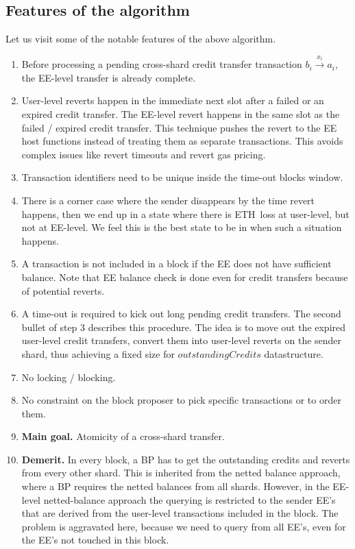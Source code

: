 \documentclass{article}
\newcommand{\eth}[0]{ETH~}
\begin{document}
\subsection{Features of the algorithm}
Let us visit some of the notable features of the above algorithm.
\begin{enumerate}
\item Before processing a pending cross-shard credit transfer transaction $b_i \stackrel{x_i}{\longrightarrow} a_i$, the EE-level transfer is already complete. 
\item User-level reverts happen in the immediate next slot after a failed or an expired credit transfer. The EE-level revert happens in the same slot as the failed / expired credit transfer. This technique pushes the revert to the EE host functions instead of treating them as separate transactions. This avoids complex issues like revert timeouts and revert gas pricing.
\item Transaction identifiers need to be unique inside the time-out blocks window.
\item There is a corner case where the sender disappears by the time revert happens, then we end up in a state where there is \eth loss at user-level, but not at EE-level. We feel this is the best state to be in when such a situation happens.
\item A transaction is not included in a block if the EE does not have sufficient balance. Note that EE balance check is done even for credit transfers because of potential reverts.
\item A time-out is required to kick out long pending credit transfers. The second bullet of step 3 describes this procedure. The idea is to move out the expired user-level credit transfers, convert them into user-level reverts on the sender shard, thus achieving a fixed size for $outstandingCredits$ datastructure.
\item No locking / blocking.
\item No constraint on the block proposer to pick specific transactions or to order them.
\item {\bf Main goal.} Atomicity of a cross-shard transfer.
\item {\bf Demerit.} In every block, a BP has to get the outstanding credits and reverts from every other shard. This is inherited from the netted balance approach, where a BP requires the netted balances from all shards. However, in the EE-level netted-balance approach the querying is restricted to the sender EE's that are derived from the user-level transactions included in the block. The problem is aggravated here, because we need to query from all EE's, even for the EE's not touched in this block.
\end{enumerate}
\end{document}
